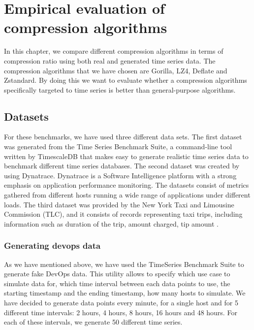 \chapter{Empirical evaluation of compression algorithms}
In this chapter, we compare different compression algorithms in terms of compression ratio using both real
and generated time series data. The compression algorithms that we have chosen are Gorilla, LZ4,
Deflate and Zstandard. By doing this we want to evaluate whether a compression algorithms specifically
targeted to time series is better than general-purpose algorithms.

\section{Datasets}
For these benchmarks, we have used three different data sets. The first dataset was generated from the
Time Series Benchmark Suite, a command-line tool written by TimescaleDB \cite{timescale_2019_timescaletsbs} that makes
easy to generate realistic time series data to benchmark different time series databases.
The second dataset was created by using Dynatrace. Dynatrace is a Software Intelligence platform with a strong
emphasis on application performance monitoring. The datasets consist of metrics gathered from
different hosts running a wide range of applications under different loads.
The third dataset was provided by the New York Taxi and Limousine Commission (TLC), and it consists
of records representing taxi trips, including information such as duration of the trip, amount
charged, tip amount \cite{tlc2019_dataset}.

\subsection{Generating devops data}
As we have mentioned above, we have used the TimeSeries Benchmark Suite to generate fake DevOps data.
This utility allows to specify which use case to simulate data for, which time interval between each data points
to use, the starting timestamp and the ending timestamp, how many hosts to simulate.
We have decided to generate data points every minute, for a single host and for 5 different time intervals:
2 hours, 4 hours, 8 hours, 16 hours and 48 hours. For each of these intervals, we generate 50 different time series.

